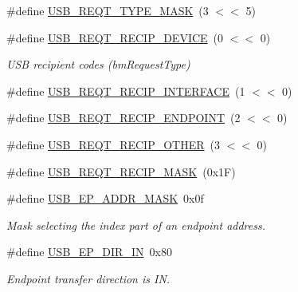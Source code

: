 \begin{DoxyCompactItemize}
\item 
\#define \hyperlink{group__usb__protocol__group_ga22abcf359d1d543593c772b328637771}{U\+S\+B\+\_\+\+R\+E\+Q\+T\+\_\+\+T\+Y\+P\+E\+\_\+\+M\+A\+SK}~(3 $<$$<$ 5)
\item 
\#define \hyperlink{group__usb__protocol__group_gafa408bab29066286d309f28c91990f98}{U\+S\+B\+\_\+\+R\+E\+Q\+T\+\_\+\+R\+E\+C\+I\+P\+\_\+\+D\+E\+V\+I\+CE}~(0 $<$$<$ 0)
\begin{DoxyCompactList}\small\item\em U\+SB recipient codes (bm\+Request\+Type) \end{DoxyCompactList}\item 
\#define \hyperlink{group__usb__protocol__group_gaa10286997b2826579fbcea8b47658925}{U\+S\+B\+\_\+\+R\+E\+Q\+T\+\_\+\+R\+E\+C\+I\+P\+\_\+\+I\+N\+T\+E\+R\+F\+A\+CE}~(1 $<$$<$ 0)
\item 
\#define \hyperlink{group__usb__protocol__group_ga39a14fff4ff1c830155aa553480fb4e8}{U\+S\+B\+\_\+\+R\+E\+Q\+T\+\_\+\+R\+E\+C\+I\+P\+\_\+\+E\+N\+D\+P\+O\+I\+NT}~(2 $<$$<$ 0)
\item 
\#define \hyperlink{group__usb__protocol__group_gac2e90c1f4f4817a4084e100163cd7b44}{U\+S\+B\+\_\+\+R\+E\+Q\+T\+\_\+\+R\+E\+C\+I\+P\+\_\+\+O\+T\+H\+ER}~(3 $<$$<$ 0)
\item 
\#define \hyperlink{group__usb__protocol__group_gaa678ebf133d90e2e033195a83d4f611b}{U\+S\+B\+\_\+\+R\+E\+Q\+T\+\_\+\+R\+E\+C\+I\+P\+\_\+\+M\+A\+SK}~(0x1\+F)
\item 
\mbox{\label{group__usb__protocol__group_ga0316d8f43a1648b76df257332b26aeb9}} 
\#define \hyperlink{group__usb__protocol__group_ga0316d8f43a1648b76df257332b26aeb9}{U\+S\+B\+\_\+\+E\+P\+\_\+\+A\+D\+D\+R\+\_\+\+M\+A\+SK}~0x0f
\begin{DoxyCompactList}\small\item\em Mask selecting the index part of an endpoint address. \end{DoxyCompactList}\item 
\mbox{\label{group__usb__protocol__group_gaae8411e95f26738326bc25a0161dde99}} 
\#define \hyperlink{group__usb__protocol__group_gaae8411e95f26738326bc25a0161dde99}{U\+S\+B\+\_\+\+E\+P\+\_\+\+D\+I\+R\+\_\+\+IN}~0x80
\begin{DoxyCompactList}\small\item\em Endpoint transfer direction is IN. \end{DoxyCompactList}\item 
$$
\end{DoxyCompactItemize}
